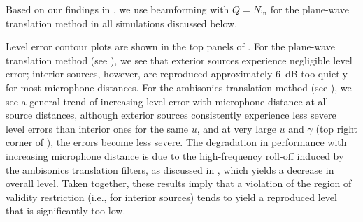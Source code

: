 Based on our findings in , we use beamforming with $Q = N_\text{in}$ for the plane-wave translation method in all simulations discussed below.


Level error contour plots are shown in the top panels of .
For the plane-wave translation method (see ), we see that exterior sources experience negligible level error;
interior sources, however, are reproduced approximately $6$~dB too quietly for most microphone distances.
For the ambisonics translation method (see ), we see a general trend of increasing level error with microphone distance at all source distances, although exterior sources consistently experience less severe level errors than interior ones for the same $u$, and at very large $u$ and $\gamma$ (top right corner of ), the errors become less severe.
The degradation in performance with increasing microphone distance is due to the high-frequency roll-off induced by the ambisonics translation filters, as discussed in , which yields a decrease in overall level.
Taken together, these results imply that a violation of the region of validity restriction (i.e., for interior sources) tends to yield a reproduced level that is significantly too low. %

